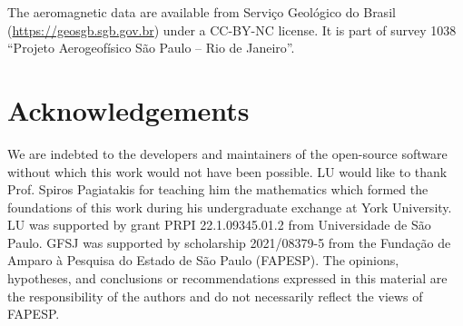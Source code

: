 The aeromagnetic data are available from Serviço Geológico do Brasil
(\url{https://geosgb.sgb.gov.br}) under a CC-BY-NC license. It is part of
survey 1038 ``Projeto Aerogeofísico São Paulo -- Rio de Janeiro''.



\section*{Acknowledgements}

We are indebted to the developers and maintainers of the open-source software
without which this work would not have been possible.
LU would like to thank Prof. Spiros Pagiatakis for teaching him the mathematics which formed the foundations of this work during his undergraduate exchange at York University.
LU was supported by grant PRPI 22.1.09345.01.2 from Universidade de São Paulo.
GFSJ was supported by scholarship 2021/08379-5 from the Fundação de Amparo à Pesquisa do Estado de São Paulo (FAPESP).
The opinions, hypotheses, and conclusions or recommendations expressed in this material are the responsibility of the authors and do not necessarily reflect the views of FAPESP.

